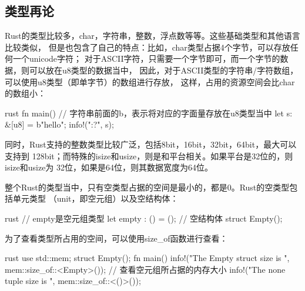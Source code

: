 \subsection{类型再论}
Rust的类型比较多，char，字符串，整数，浮点数等等。这些基础类型和其他语言比较类似，
但是也包含了自己的特点：比如，char类型占据4个字节，可以存放任何一个unicode字符；
对于ASCII字符，只需要一个字节即可，而一个字节的数据，则可以放在u8类型的数据当中，
因此，对于ASCII类型的字符串/字符数组，可以使用u8类型（即单字节）的数组进行存放，
这样，占用的资源空间会比char的数组小：
\begin{code-block}{rust}
fn main() {
    // 字符串前面的b，表示将对应的字面量存放在u8类型当中
    let s: &[u8] = b"hello";
    info!("{:?}", s);
}
\end{code-block}
同时，Rust支持的整数类型比较广泛，包括8bit，16bit，32bit，64bit，最大可以支持到
128bit；而特殊的isize和usize，则是和平台相关。如果平台是32位的，则isize和usize为
32位，如果是64位，则其数据宽度为64位。

整个Rust的类型当中，只有空类型占据的空间是最小的，都是0。Rust的空类型包括单元类型
（unit，即空元组）以及空结构体：
\begin{code-block}{rust}
// empty是空元组类型
let empty : () = ();
// 空结构体
struct Empty();
\end{code-block}
为了查看类型所占用的空间，可以使用size\_of函数进行查看：
\begin{code-block}{rust}
use std::mem;
struct Empty();
fn main() {
    info!("The Empty struct size is {}", mem::size_of::<Empty>());
    // 查看空元组所占据的内存大小
    info!("The none tuple size is {}", mem::size_of::<()>());
}
\end{code-block}

